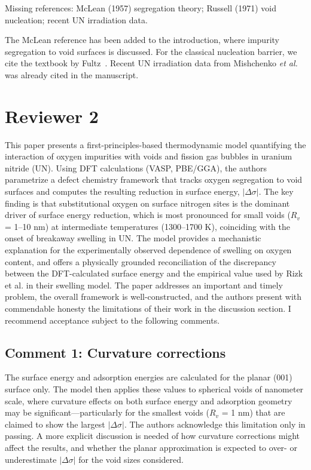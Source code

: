 \documentclass[12pt]{article}
\begin{document}
\color{blue}
Missing references: McLean (1957) segregation theory; Russell (1971) void nucleation; recent UN irradiation data.\\
\color{black}

The McLean reference has been added to the introduction, where impurity segregation to void surfaces is discussed. For the classical nucleation barrier, we cite the textbook by Fultz~\cite{Fultz2020}. Recent UN irradiation data from Mishchenko \textit{et al.}~\cite{Mishchenko2021} was already cited in the manuscript.\\

\section*{Reviewer 2}

\color{blue}

This paper presents a first-principles-based thermodynamic model quantifying the interaction of oxygen impurities with voids and fission gas bubbles in uranium nitride (UN). Using DFT calculations (VASP, PBE/GGA), the authors parametrize a defect chemistry framework that tracks oxygen segregation to void surfaces and computes the resulting reduction in surface energy, $|\Delta \sigma|$. The key finding is that substitutional oxygen on surface nitrogen sites is the dominant driver of surface energy reduction, which is most pronounced for small voids ($R_v$ = 1--10 nm) at intermediate temperatures (1300--1700 K), coinciding with the onset of breakaway swelling in UN. The model provides a mechanistic explanation for the experimentally observed dependence of swelling on oxygen content, and offers a physically grounded reconciliation of the discrepancy between the DFT-calculated surface energy and the empirical value used by Rizk et al. in their swelling model. The paper addresses an important and timely problem, the overall framework is well-constructed, and the authors present with commendable honesty the limitations of their work in the discussion section. I recommend acceptance subject to the following comments.

\color{black}

\subsection*{Comment 1: Curvature corrections}

\color{blue}
The surface energy and adsorption energies are calculated for the planar (001) surface only. The model then applies these values to spherical voids of nanometer scale, where curvature effects on both surface energy and adsorption geometry may be significant---particularly for the smallest voids ($R_v$ = 1 nm) that are claimed to show the largest $|\Delta \sigma|$. The authors acknowledge this limitation only in passing. A more explicit discussion is needed of how curvature corrections might affect the results, and whether the planar approximation is expected to over- or underestimate $|\Delta \sigma|$ for the void sizes considered.\\
\color{black}
\end{document}
